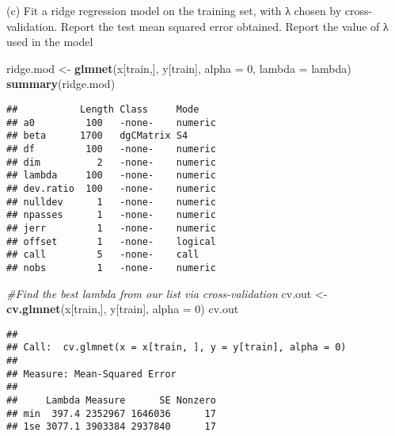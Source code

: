 \documentclass[
  ignorenonframetext,
]{beamer}
\newenvironment{Shaded}{\begin{snugshade}}{\end{snugshade}}
\newcommand{\CommentTok}[1]{\textcolor[rgb]{0.56,0.35,0.01}{\textit{#1}}}
\newcommand{\DataTypeTok}[1]{\textcolor[rgb]{0.13,0.29,0.53}{#1}}
\newcommand{\DecValTok}[1]{\textcolor[rgb]{0.00,0.00,0.81}{#1}}
\newcommand{\KeywordTok}[1]{\textcolor[rgb]{0.13,0.29,0.53}{\textbf{#1}}}
\newcommand{\NormalTok}[1]{#1}
\newcommand{\OperatorTok}[1]{\textcolor[rgb]{0.81,0.36,0.00}{\textbf{#1}}}
\newcommand{\StringTok}[1]{\textcolor[rgb]{0.31,0.60,0.02}{#1}}
\begin{document}
\begin{frame}[fragile]{(c) Fit a ridge regression model on the training
set, with λ chosen by cross-validation. Report the test mean squared
error obtained. Report the value of λ used in the model}
\protect\hypertarget{c-fit-a-ridge-regression-model-on-the-training-set-with-ux3bb-chosen-by-cross-validation.-report-the-test-mean-squared-error-obtained.-report-the-value-of-ux3bb-used-in-the-model}{}

\begin{Shaded}
\begin{Highlighting}[]
\NormalTok{ridge.mod <-}\StringTok{ }\KeywordTok{glmnet}\NormalTok{(x[train,], y[train], }\DataTypeTok{alpha =} \DecValTok{0}\NormalTok{, }\DataTypeTok{lambda =}\NormalTok{ lambda)}
\KeywordTok{summary}\NormalTok{(ridge.mod)}
\end{Highlighting}
\end{Shaded}

\begin{verbatim}
##           Length Class     Mode   
## a0         100   -none-    numeric
## beta      1700   dgCMatrix S4     
## df         100   -none-    numeric
## dim          2   -none-    numeric
## lambda     100   -none-    numeric
## dev.ratio  100   -none-    numeric
## nulldev      1   -none-    numeric
## npasses      1   -none-    numeric
## jerr         1   -none-    numeric
## offset       1   -none-    logical
## call         5   -none-    call   
## nobs         1   -none-    numeric
\end{verbatim}

\begin{Shaded}
\begin{Highlighting}[]
\CommentTok{#Find the best lambda from our list via cross-validation}
\NormalTok{cv.out <-}\StringTok{ }\KeywordTok{cv.glmnet}\NormalTok{(x[train,], y[train], }\DataTypeTok{alpha =} \DecValTok{0}\NormalTok{)}
\NormalTok{cv.out}
\end{Highlighting}
\end{Shaded}

\begin{verbatim}
## 
## Call:  cv.glmnet(x = x[train, ], y = y[train], alpha = 0) 
## 
## Measure: Mean-Squared Error 
## 
##     Lambda Measure      SE Nonzero
## min  397.4 2352967 1646036      17
## 1se 3077.1 3903384 2937840      17
\end{verbatim}

\begin{Shaded}
\end{Shaded}


\end{frame}
\end{document}
